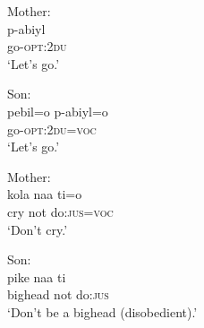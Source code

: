 \documentclass[output=paper]{langsci/langscibook}
\begin{document}
\begin{exe}
\begin{xlist}
	\ex Mother:\label{ex:ar25g}\\
	\gll p-abiyl\\
	go-\textsc{opt}:2\textsc{du}\\
	\trans ‘Let’s go.’
	
	\ex Son:\label{ex:ar25h}\\ 
	\gll pebil=o p-abiyl=o\\
	go-\textsc{opt}:2\textsc{du}=\textsc{voc}\\
	\trans ‘Let’s go.’
	
	\ex Mother:\label{ex:ar25i}\\
	\gll kola naa ti=o\\
	cry not do:\textsc{jus}=\textsc{voc}\\
	\trans ‘Don’t cry.’
	
	\ex Son:\label{ex:ar25k}\\
	\gll pike naa ti\\
	bighead not do:\textsc{jus}\\
	\trans ‘Don’t be a bighead (disobedient).’
	\end{xlist}
\end{exe}
\end{document}

